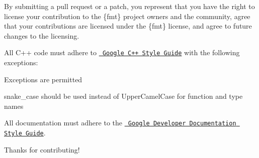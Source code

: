 By submitting a pull request or a patch, you represent that you have the right to license your contribution to the \{fmt\} project owners and the community, agree that your contributions are licensed under the \{fmt\} license, and agree to future changes to the licensing.

All C++ code must adhere to \href{https://google.github.io/styleguide/cppguide.html}{\texttt{ Google C++ Style Guide}} with the following exceptions\+:


\begin{DoxyItemize}
\item Exceptions are permitted
\item snake\+\_\+case should be used instead of Upper\+Camel\+Case for function and type names
\end{DoxyItemize}

All documentation must adhere to the \href{https://developers.google.com/style}{\texttt{ Google Developer Documentation Style Guide}}.

Thanks for contributing! 